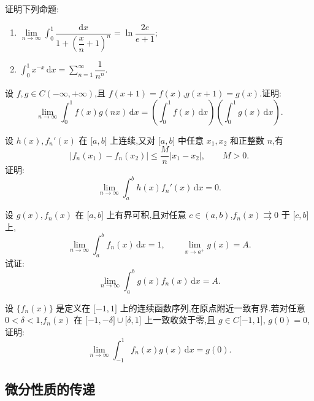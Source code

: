 \documentclass[../数学分析培优讲义.tex]{subfiles}
\begin{document}
\begin{example}
证明下列命题:
\begin{enumerate}[label=(\arabic*)]
    \item $\displaystyle\lim\limits_{n\to\infty}\int_0^1\dfrac{\mathrm{d}x}{1+\left(\dfrac{x}{n}+1\right)^n}=\ln\dfrac{2e}{e+1}$;
    \item $\displaystyle\int_0^1x^{-x}\,\mathrm{d}x=\sum\limits_{n=1}^{\infty}\dfrac{1}{n^n}$.
\end{enumerate}
\end{example}
\exampleblank

\begin{example}
设 $f,g\in C(-\infty,+\infty)$,且 $f(x+1)=f(x)$,$g(x+1)=g(x)$.证明:
\[
    \lim\limits_{n\to\infty}\int_0^1f(x)g(nx)\,\mathrm{d}x
    =\left(\int_0^1f(x)\,\mathrm{d}x\right)
     \left(\int_0^1g(x)\,\mathrm{d}x\right).
\]
\end{example}
\exampleblank

\begin{example}
设 $h(x),f_n'(x)$ 在 $\lbrack a,b\rbrack$ 上连续,又对 $\lbrack a,b\rbrack$ 中任意 $x_1,x_2$ 和正整数 $n$,有
\[
    |f_n(x_1)-f_n(x_2)|\leq\dfrac{M}{n}|x_1-x_2|,
    \qquad M>0.
\]
证明:
\[
    \lim\limits_{n\to\infty}\int_a^bh(x)f_n'(x)\,\mathrm{d}x=0.
\]
\end{example}
\exampleblank

\begin{example}
设 $g(x),f_n(x)$ 在 $\lbrack a,b\rbrack$ 上有界可积,且对任意 $c\in(a,b)$,$f_n(x)\rightrightarrows0$ 于 $\lbrack c,b\rbrack$ 上,
\[
    \lim\limits_{n\to\infty}\int_a^bf_n(x)\,\mathrm{d}x=1,
    \qquad
    \lim\limits_{x\to a^+}g(x)=A.
\]
试证:
\[
    \lim\limits_{n\to\infty}\int_a^bg(x)f_n(x)\,\mathrm{d}x=A.
\]
\end{example}
\exampleblank

\begin{example}
设 $\{f_n(x)\}$ 是定义在 $\lbrack -1,1\rbrack$ 上的连续函数序列,在原点附近一致有界.若对任意 $0<\delta<1$,$f_n(x)$ 在 $\lbrack -1,-\delta\rbrack\cup\lbrack \delta,1\rbrack$ 上一致收敛于零,且 $g\in C\lbrack -1,1\rbrack$, $g(0)=0$,证明:
\[
    \lim\limits_{n\to\infty}\int_{-1}^{1}f_n(x)g(x)\,\mathrm{d}x=g(0).
\]
\end{example}
\exampleblank


\newpage

\subsection{微分性质的传递}
\end{document}
